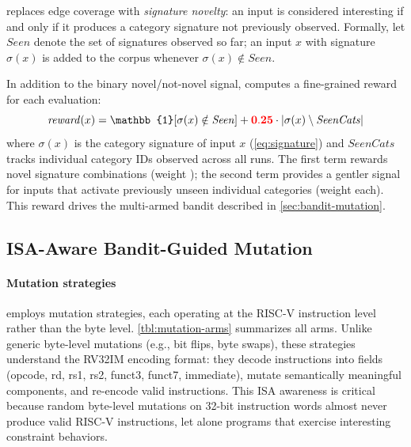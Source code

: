 \tool replaces edge coverage with \emph{signature novelty}: an input is considered interesting if and only if it produces a category signature not previously observed. Formally, let $\mathit{Seen}$ denote the set of signatures observed so far; an input $x$ with signature $\sigma(x)$ is added to the corpus whenever $\sigma(x) \notin \mathit{Seen}$.

In addition to the binary novel/not-novel signal, \tool computes a fine-grained reward for each evaluation:
\[
\mathit{reward}(x) = \mathbb{1}[\sigma(x) \notin \mathit{Seen}] + \tbd{0.25} \cdot |\sigma(x) \setminus \mathit{SeenCats}|
\]
where $\sigma(x)$ is the category signature of input $x$ (\autoref{eq:signature}) and $\mathit{SeenCats}$ tracks individual category IDs observed across all runs. The first term rewards novel signature combinations (weight ); the second term provides a gentler signal for inputs that activate previously unseen individual categories (weight  each). This reward drives the multi-armed bandit described in \autoref{sec:bandit-mutation}.

\subsection{ISA-Aware Bandit-Guided Mutation}\label{sec:bandit-mutation}

\paragraph{Mutation strategies}
\tool employs  mutation strategies, each operating at the RISC-V instruction level rather than the byte level. \autoref{tbl:mutation-arms} summarizes all  arms. Unlike generic byte-level mutations (e.g., bit flips, byte swaps), these strategies understand the RV32IM encoding format: they decode instructions into fields (opcode, rd, rs1, rs2, funct3, funct7, immediate), mutate semantically meaningful components, and re-encode valid instructions. This ISA awareness is critical because random byte-level mutations on 32-bit instruction words almost never produce valid RISC-V instructions, let alone programs that exercise interesting constraint behaviors.

